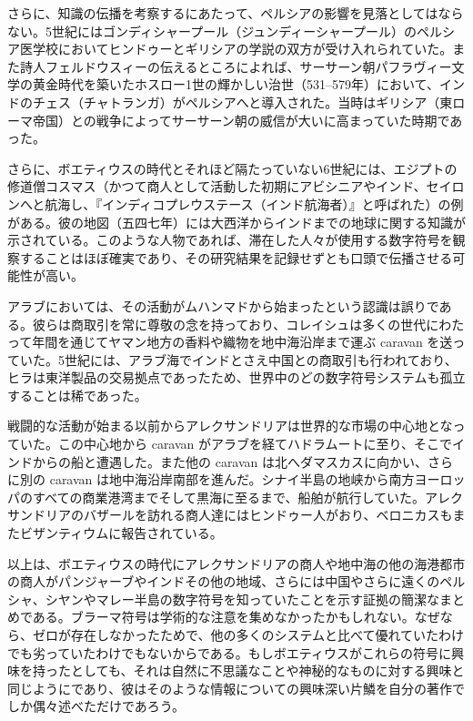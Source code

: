 \documentclass[a4paper,11pt,openany]{ltjsbook}
\begin{document}
さらに、知識の伝播を考察するにあたって、ペルシアの影響を見落としてはならない。5世紀にはゴンディシャープール（ジュンディーシャープール）のペルシア医学校においてヒンドゥーとギリシアの学説の双方が受け入れられていた。また詩人フェルドウスィーの伝えるところによれば、サーサーン朝パフラヴィー文学の黄金時代を築いたホスロー1世の輝かしい治世（531--579年）において、インドのチェス（チャトランガ）がペルシアへと導入された。当時はギリシア（東ローマ帝国）との戦争によってサーサーン朝の威信が大いに高まっていた時期であった。

さらに、ボエティウスの時代とそれほど隔たっていない6世紀には、エジプトの修道僧コスマス（かつて商人として活動した初期にアビシニアやインド、セイロンへと航海し、『インディコプレウステース（インド航海者）』と呼ばれた）の例がある。彼の地図（五四七年）には大西洋からインドまでの地球に関する知識が示されている。このような人物であれば、滞在した人々が使用する数字符号を観察することはほぼ確実であり、その研究結果を記録せずとも口頭で伝播させる可能性が高い。

アラブにおいては、その活動がムハンマドから始まったという認識は誤りである。彼らは商取引を常に尊敬の念を持っており、コレイシュは多くの世代にわたって年間を通じてヤマン地方の香料や織物を地中海沿岸まで運ぶ caravan を送っていた。5世紀には、アラブ海でインドとさえ中国との商取引も行われており、ヒラは東洋製品の交易拠点であったため、世界中のどの数字符号システムも孤立することは稀であった。

戦闘的な活動が始まる以前からアレクサンドリアは世界的な市場の中心地となっていた。この中心地から caravan がアラブを経てハドラムートに至り、そこでインドからの船と遭遇した。また他の caravan は北へダマスカスに向かい、さらに別の caravan は地中海沿岸南部を進んだ。シナイ半島の地峡から南方ヨーロッパのすべての商業港湾までそして黒海に至るまで、船舶が航行していた。アレクサンドリアのバザールを訪れる商人達にはヒンドゥー人がおり、ベロニカスもまたビザンティウムに報告されている。

以上は、ボエティウスの時代にアレクサンドリアの商人や地中海の他の海港都市の商人がパンジャーブやインドその他の地域、さらには中国やさらに遠くのペルシャ、シヤンやマレー半島の数字符号を知っていたことを示す証拠の簡潔なまとめである。ブラーマ符号は学術的な注意を集めなかったかもしれない。なぜなら、ゼロが存在しなかったためで、他の多くのシステムと比べて優れていたわけでも劣っていたわけでもないからである。もしボエティウスがこれらの符号に興味を持ったとしても、それは自然に不思議なことや神秘的なものに対する興味と同じようにであり、彼はそのような情報についての興味深い片鱗を自分の著作でしか偶々述べただけであろう。
\end{document}
